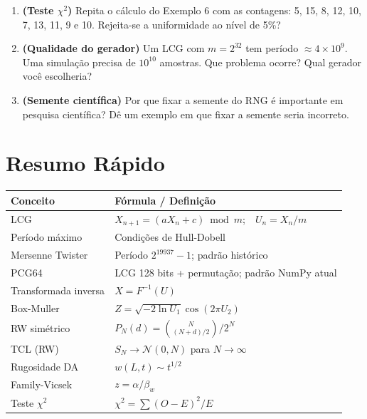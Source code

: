 \documentclass[12pt,a4paper]{article}
\begin{document}
\begin{enumerate}
\item \textbf{(Teste $\chi^2$)} Repita o c\'alculo do Exemplo 6 com as contagens:
  5, 15, 8, 12, 10, 7, 13, 11, 9 e 10.
  Rejeita-se a uniformidade ao n\'ivel de 5\%?

\item \textbf{(Qualidade do gerador)} Um LCG com $m=2^{32}$ tem per\'iodo $\approx 4\times10^9$. Uma simula\c{c}\~ao precisa de $10^{10}$ amostras. Que problema ocorre? Qual gerador voc\^e escolheria?

\item \textbf{(Semente cient\'ifica)} Por que fixar a semente do RNG \'e importante em pesquisa cient\'ifica? D\^e um exemplo em que fixar a semente seria incorreto.

\end{enumerate}

\section{Resumo R\'apido}

\begin{center}
\begin{tabular}{ll}
\toprule
Conceito & F\'ormula / Defini\c{c}\~ao \\
\midrule
LCG & $X_{n+1} = (aX_n + c)\bmod m$;\ \ $U_n = X_n/m$ \\
Per\'iodo m\'aximo & Condi\c{c}\~oes de Hull-Dobell \\
Mersenne Twister & Per\'iodo $2^{19937}-1$; padr\~ao hist\'orico \\
PCG64 & LCG 128 bits + permuta\c{c}\~ao; padr\~ao NumPy atual \\
Transformada inversa & $X = F^{-1}(U)$ \\
Box-Muller & $Z = \sqrt{-2\ln U_1}\cos(2\pi U_2)$ \\
RW sim\'etrico & $P_N(d) = \binom{N}{(N+d)/2}/2^N$ \\
TCL (RW) & $S_N \to \mathcal{N}(0,N)$ para $N \to \infty$ \\
Rugosidade DA & $w(L,t) \sim t^{1/2}$ \\
Family-Vicsek & $z = \alpha/\beta_w$ \\
Teste $\chi^2$ & $\chi^2 = \sum(O-E)^2/E$ \\
\bottomrule
\end{tabular}
\end{center}
\end{document}

